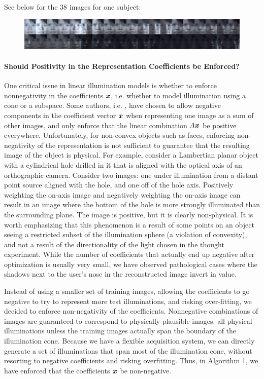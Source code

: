 See below for the 38 images for one subject:
\begin{figure}[h]
\centering
\includegraphics[width=6.3in]{figures_cvpr/training.png}
\end{figure}
\vspace{0mm}

\paragraph{Should Positivity in the Representation Coefficients be Enforced?}
One critical issue in linear illumination models is whether to enforce nonnegativity in the coefficients ${\boldsymbol{x}}$, i.e. whether to model illumination using a cone or a subspace.   Some authors, i.e. \cite{Basri2003-PAMI}, have chosen to allow negative components in the coefficient vector ${\boldsymbol{x}}$ when representing one image as a sum of other images, and only enforce that the linear combination $A{\boldsymbol{x}}$ be positive everywhere.  Unfortunately, for non-convex objects such as faces, enforcing non-negativity of the representation is not sufficient to guarantee that the resulting image of the object is physical.  For example, consider a Lambertian planar object with a cylindrical hole drilled in it that is aligned with the optical axis of an orthographic camera.  Consider two images: one under illumination from a distant point source aligned with the hole, and one off of the hole axis.  Positively weighting the on-axis image and negatively weighting the on-axis image can result in an image where the bottom of the hole is more strongly illuminated than the surrounding plane.  The image is positive, but it is clearly non-physical.  It is worth emphasizing that this phenomenon is a result of some points on an object seeing a restricted subset of the illumination sphere (a violation of convexity),  and not a result of the directionality of the light chosen in the thought experiment.  While the number of coefficients that actually end up negative after optimization is usually very small, we have observed pathological cases where the shadows next to the user's nose in the reconstructed image invert in value.  

Instead of using a smaller set of training images, allowing the coefficients to go negative to try to represent more test illuminations, and risking over-fitting, we decided to enforce non-negativity of the coefficients.  Nonnegative combinations of images are guaranteed to correspond to physically plausible images.  all physical illuminations unless the training images actually span the boundary of the illumination cone. 
Because we have a flexible acquisition system, we can directly generate a set of illuminations that span most of the illumination cone, without resorting to negative coefficients and risking overfitting.  Thus, in Algorithm 1, we have enforced that the coefficients ${\boldsymbol{x}}$ be non-negative.

